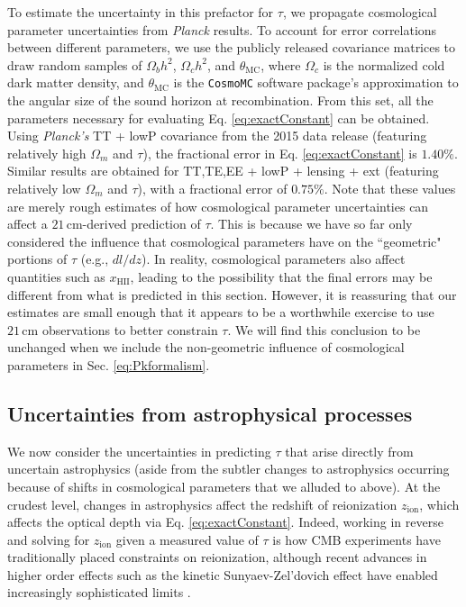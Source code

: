 \documentclass[twocolumn,aps,prd,nofootinbib,showpacs,superscriptaddress]{revtex4-1}
\begin{document}
To estimate the uncertainty in this prefactor for $\tau$, we propagate cosmological parameter uncertainties from \emph{Planck} results. To account for error correlations between different parameters, we use the publicly released covariance matrices to draw random samples of $\Omega_b h^2$, $\Omega_c h^2$, and $\theta_\textrm{MC}$, where $\Omega_c$ is the normalized cold dark matter density, and $\theta_\textrm{MC}$ is the {\tt CosmoMC} software package's \cite{lewis_and_bridle2002} approximation to the angular size of the sound horizon at recombination. From this set, all the parameters necessary for evaluating Eq. \eqref{eq:exactConstant} can be obtained. Using \emph{Planck's} TT + lowP covariance from the 2015 data release (featuring relatively high $\Omega_m$ and $\tau$), the fractional error in Eq. \eqref{eq:exactConstant} is $1.40\%$. Similar results are obtained for TT,TE,EE + lowP + lensing + ext (featuring relatively low $\Omega_m$ and $\tau$), with a fractional error of $0.75\%$. Note that these values are merely rough estimates of how cosmological parameter uncertainties can affect a $21\,\textrm{cm}$-derived prediction of $\tau$. This is because we have so far only considered the influence that cosmological parameters have on the ``geometric" portions of $\tau$ (e.g., $dl/dz$). In reality, cosmological parameters also affect quantities such as $x_\textrm{HII}$, leading to the possibility that the final errors may be different from what is predicted in this section. However, it is reassuring that our estimates are small enough that it appears to be a worthwhile exercise to use $21\,\textrm{cm}$ observations to better constrain $\tau$. We will find this conclusion to be unchanged when we include the non-geometric influence of cosmological parameters in Sec. \ref{eq:Pkformalism}.



\subsection{Uncertainties from astrophysical processes}
\label{sec:astroUncertainties}

We now consider the uncertainties in predicting $\tau$ that arise directly from uncertain astrophysics (aside from the subtler changes to astrophysics occurring because of shifts in cosmological parameters that we alluded to above). At the crudest level, changes in astrophysics affect the redshift of reionization $z_\textrm{ion}$, which affects the optical depth via Eq. \eqref{eq:exactConstant}. Indeed, working in reverse and solving for $z_\textrm{ion}$ given a measured value of $\tau$ is how CMB experiments have traditionally placed constraints on reionization, although recent advances in higher order effects such as the kinetic Sunyaev-Zel'dovich effect have enabled increasingly sophisticated limits \cite{zahn_et_al2012,sievers_et_al2013,george_et_al2015}.
\end{document}
